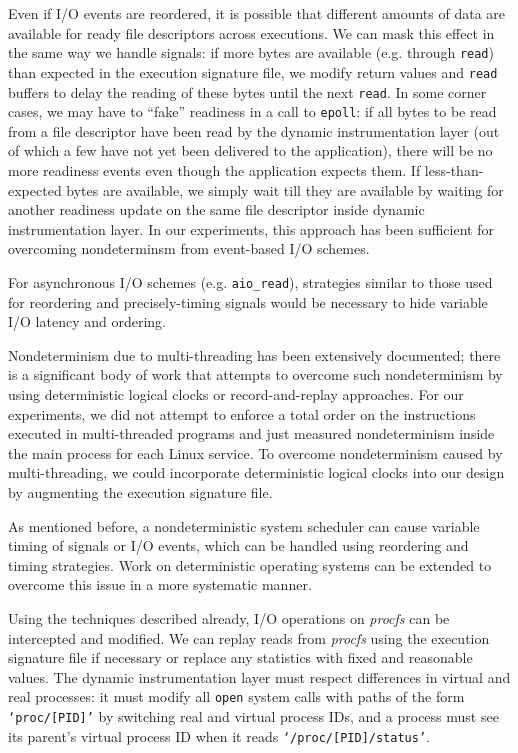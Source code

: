 Even if I/O events are reordered,
it is possible that different amounts
of data are available for ready
file descriptors across executions. We can 
mask this effect in the same
way we handle signals: if more bytes
are available (e.g. through \texttt{read}) 
than expected in the execution signature
file, we modify return values and \texttt{read}
buffers to delay the reading of these bytes
until the next \texttt{read}. In some corner
cases, we may have to ``fake'' readiness
in a call to \texttt{epoll}: if all bytes to be read from
a file descriptor have been read by 
the dynamic instrumentation layer (out of which
a few have not yet been delivered to the application),
there will be no more readiness events even
though the application expects them. If less-than-expected
bytes are available, we simply wait
till they are available by waiting for
another readiness update on the same file descriptor inside 
dynamic instrumentation layer.
In our experiments, this approach has been sufficient 
for overcoming nondeterminsm from event-based I/O
schemes.

For asynchronous I/O schemes (e.g. \texttt{aio\_read}), strategies
similar to those used for reordering
and precisely-timing signals would be necessary to hide
variable I/O latency and ordering.
\newline

 \newline
Nondeterminism due to multi-threading
has been extensively documented; there
is a significant body of work that
attempts to overcome such nondeterminism
by using deterministic logical clocks
or record-and-replay approaches. 
For our experiments, we did not attempt to enforce
a total order on the instructions executed in multi-threaded
programs and just measured nondeterminism inside 
the main process for each Linux service.
To overcome nondeterminism caused
by multi-threading, we could incorporate
deterministic logical clocks 
into our design by augmenting the
execution signature file.

As mentioned before, a nondeterministic system scheduler
can cause variable timing of signals
or I/O events, which
can be handled using reordering and
timing strategies.
Work on deterministic
operating systems can
be extended to overcome this issue
in a more systematic manner. \newline

 \newline
Using the techniques described
already, I/O operations on {\em procfs} can be intercepted
and modified. We can 
replay reads from {\em procfs} using the execution signature
file if necessary or replace any statistics with fixed and 
reasonable values. The dynamic instrumentation layer 
must respect differences in virtual and real processes:
it must modify all \texttt{open} system calls with paths
of the form \texttt{`proc/[PID]'}
by switching real and virtual process IDs,
and a process must see its 
parent's virtual process ID when it reads
\texttt{`/proc/[PID]/status'}.

